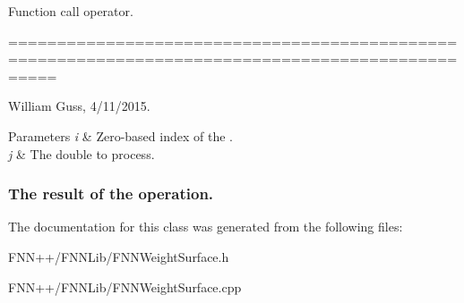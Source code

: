 Function call operator. 

=================================================================================================

William Guss, 4/11/2015. 


\begin{DoxyParams}{Parameters}
{\em i} & Zero-\/based index of the . \\
\hline
{\em j} & The double to process. \\
\hline
\end{DoxyParams}


\subsubsection*{The result of the operation.  }

The documentation for this class was generated from the following files\+:\begin{DoxyCompactItemize}
\item 
F\+N\+N++/\+F\+N\+N\+Lib/F\+N\+N\+Weight\+Surface.\+h\item 
F\+N\+N++/\+F\+N\+N\+Lib/F\+N\+N\+Weight\+Surface.\+cpp\end{DoxyCompactItemize}

